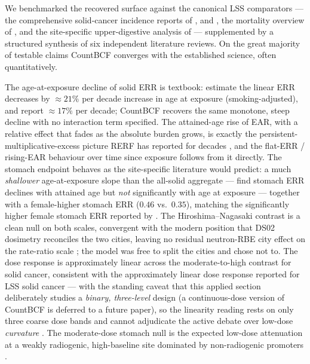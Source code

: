 \documentclass[11pt]{article}
\begin{document}
We benchmarked the recovered surface against the canonical LSS comparators
--- the comprehensive solid-cancer incidence reports of
\citet{thompson1994}, \citet{preston2007} and \citet{grant2017}, the mortality
overview of \citet{ozasa2012}, and the site-specific upper-digestive analysis
of \citet{sakata2019} --- supplemented by a structured synthesis of six
independent literature reviews. On the great majority of testable claims
CountBCF converges with the established science, often quantitatively.

The age-at-exposure decline of solid ERR is textbook: \citet{grant2017}
estimate the linear ERR decreases by $\approx 21\%$ per decade increase in
age at exposure (smoking-adjusted), and \citet{preston2007} report
$\approx 17\%$ per decade; CountBCF recovers the same monotone, steep decline
with no interaction term specified. The attained-age rise of EAR, with a
relative effect that fades as the absolute burden grows, is exactly the
persistent-multiplicative-excess picture RERF has reported for decades
\citep{preston2007, ozasa2012}, and the flat-ERR / rising-EAR behaviour over
time since exposure follows from it directly. The stomach endpoint behaves as
the site-specific literature would predict: a much \emph{shallower}
age-at-exposure slope than the all-solid aggregate --- \citet{sakata2019}
find stomach ERR declines with attained age but \emph{not} significantly with
age at exposure --- together with a female-higher stomach ERR ($0.46$ vs.\
$0.35$), matching the significantly higher female stomach ERR reported by
\citet{sakata2019}. The Hiroshima--Nagasaki contrast is a clean null on both
scales, convergent with the modern position that DS02 dosimetry reconciles
the two cities, leaving no residual neutron-RBE city effect on the
rate-ratio scale \citep{preston2007, ds02}; the model was free to split the
cities and chose not to. The dose response is approximately linear across the
moderate-to-high contrast for solid cancer, consistent with the
approximately linear dose response reported for LSS solid cancer
\citep{preston2007, grant2017} --- with the standing caveat that this applied
section deliberately studies a \emph{binary, three-level} design (a
continuous-dose version of CountBCF is deferred to a future paper), so the
linearity reading rests on only three coarse dose bands and cannot adjudicate
the active debate over low-dose \emph{curvature} \citep{cologne2019}. The
moderate-dose stomach null is the expected low-dose attenuation at a weakly
radiogenic, high-baseline site dominated by non-radiogenic promoters
\citep{sakata2019}.
\end{document}
